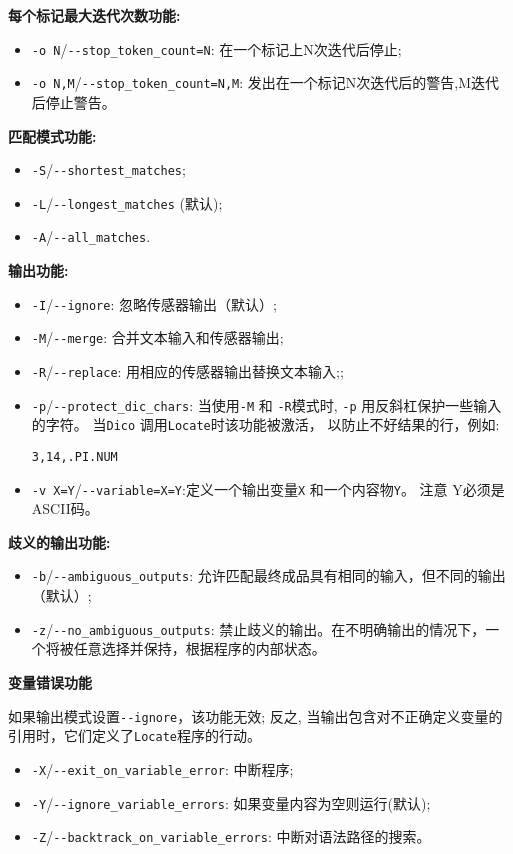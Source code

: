 \bigskip
\noindent \textbf{每个标记最大迭代次数功能:}
\begin{itemize}
\item \verb+-o N+/\verb+--stop_token_count=N+: 在一个标记上N次迭代后停止;
\item \verb+-o N,M+/\verb+--stop_token_count=N,M+: 发出在一个标记N次迭代后的警告,M迭代后停止警告。

\end{itemize}

\bigskip
\noindent \textbf{匹配模式功能:}
\begin{itemize}
  \item \verb+-S+/\verb+--shortest_matches+;
  \item \verb+-L+/\verb+--longest_matches+ (默认);
  \item \verb+-A+/\verb+--all_matches+.
\end{itemize}

\bigskip
\noindent \textbf{输出功能:}
\begin{itemize}
\item \verb+-I+/\verb+--ignore+: 忽略传感器输出（默认）;
\item \verb+-M+/\verb+--merge+: 合并文本输入和传感器输出;
\item \verb+-R+/\verb+--replace+: 用相应的传感器输出替换文本输入;;
\item \verb+-p+/\verb+--protect_dic_chars+: 当使用\verb+-M+ 和 \verb+-R+模式时,
	\verb+-p+ 用反斜杠保护一些输入的字符。
	当\verb+Dico+ 调用\verb+Locate+时该功能被激活，
	以防止不好结果的行，例如:
  
  \verb+3,14,.PI.NUM+
  \item \verb+-v X=Y+/\verb+--variable=X=Y+:定义一个输出变量\verb+X+ 和一个内容物\verb+Y+。 
  	  注意 Y必须是ASCII码。
\end{itemize}

\bigskip
\noindent \textbf{歧义的输出功能:}
\begin{itemize}
  \item \verb+-b+/\verb+--ambiguous_outputs+: 允许匹配最终成品具有相同的输入，但不同的输出（默认）;
\item \verb+-z+/\verb+--no_ambiguous_outputs+: 禁止歧义的输出。在不明确输出的情况下，一个将被任意选择并保持，根据程序的内部状态。
\end{itemize}

\bigskip
\noindent \textbf{变量错误功能}

\noindent 如果输出模式设置\verb+--ignore+，该功能无效; 反之, 当输出包含对不正确定义变量的引用时，它们定义了\verb+Locate+程序的行动。
\begin{itemize}
\item \verb+-X+/\verb+--exit_on_variable_error+: 中断程序;
\item \verb+-Y+/\verb+--ignore_variable_errors+: 如果变量内容为空则运行(默认);
\item \verb+-Z+/\verb+--backtrack_on_variable_errors+: 中断对语法路径的搜索。
\end{itemize}
  
